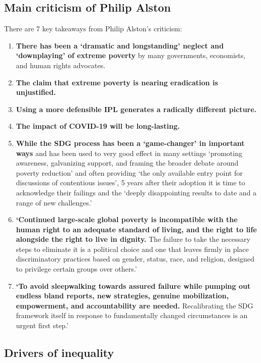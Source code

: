 \documentclass[../summary.tex]{subfiles}
\begin{document}
	\subsection{Main criticism of Philip Alston}
	
	There are 7 key takeaways from Philip Alston's criticism:
	\begin{enumerate}
		\item \textbf{There has been a ‘dramatic and longstanding’ neglect and ‘downplaying’ of extreme poverty} by many governments, economists, and human rights advocates.
		\item \textbf{The claim that extreme poverty is nearing eradication is unjustified.}
		\item  \textbf{Using a more defensible IPL generates a radically different picture.}
		\item \textbf{The impact of COVID-19 will be long-lasting.}
		\item \textbf{While the SDG process has been a ‘game-changer’ in important ways} and has been used to very good effect in many settings ‘promoting awareness, galvanizing support, and framing the broader debate around poverty reduction’ and often providing ‘the only available entry point for discussions of contentious issues’, 5 years after their adoption it is time to acknowledge their failings and the ‘deeply disappointing results to date and a range of new challenges.’
		\item \textbf{‘Continued large-scale global poverty is incompatible with the human right to an adequate standard of living, and the right to life alongside the right to live in dignity.} The failure to take the necessary steps to eliminate it is a political choice and one that leaves firmly in place discriminatory practices based on gender, status, race, and religion, designed to privilege certain groups over others.’ 
		\item \textbf{‘To avoid sleepwalking towards assured failure while pumping out endless bland reports, new strategies, genuine mobilization, empowerment, and accountability are needed.} Recalibrating the SDG framework itself in response to fundamentally changed circumstances is an urgent first step.’
	\end{enumerate}
	
	\subsection{Drivers of inequality}
	
\end{document}

